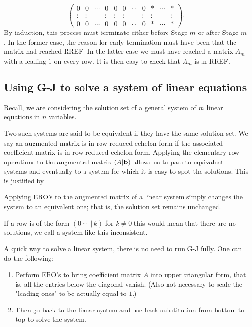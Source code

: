 \documentclass[10pt, a4paper]{article}
\begin{document}
\begin{enumerate}[label = (\roman*).]
\[\begin{pmatrix}
        0 & 0 & \dotsi & 0 & 0 & 0 & \dotsi & 0 & * & \dotsi & * \\
        \vdots & \vdots & \phantom{} & \vdots & \vdots & \vdots & \phantom{} & \vdots & \vdots & \phantom{} & \vdots \\
        0 & 0 & \dotsi & 0 & 0 & 0 & \dotsi & 0 & * & \dotsi & *
    \end{pmatrix}.
    \]
    By induction, this process must terminate either before Stage $m$ or after Stage $m$.
    In the former case,
    the reason for early termination must have been that the matrix had reached RREF.
    In the latter case we must have reached a matrix $A_m$ with a leading $1$ on every row.
    It is then easy to check that $A_m$ is in RREF.
\end{enumerate}

\subsection{Using G-J to solve a system of linear equations}
Recall, we are considering the solution set of a general system of $m$ linear equations in $n$ variables.

Two such systems are said to be equivalent if they have the same solution set.
We say an augmented matrix is in row reduced echelon form if the associated coefficient matrix is in row reduced echelon form.
Applying the elementary row operations to the augmented matrix $(A | \mathbf{b})$ allows us to pass to equivalent systems and eventually to a system for which it is easy to spot the solutions.
This is justified by
\begin{theorem}\label{pre:linalg:thm:lintoech}
    Applying ERO's to the augmented matrix of a linear system simply changes the system to an equivalent one; that is, the solution set remains unchanged.
\end{theorem}

If a row is of the form $(0\ \dotsi\ \,|\, k)$ for $k \neq 0$ this would mean that there are no solutions,
we call a system like this inconsistent.

A quick way to solve a linear system,
there is no need to run G-J fully.
One can do the following:
\begin{enumerate}[label = \arabic*) :]
    \item Perform ERO's to bring coefficient matrix $A$ into upper triangular form,
    that is, all the entries below the diagonal vanish.
    (Also not necessary to scale the "leading ones" to be actually equal to $1$.)
    \item Then go back to the linear system and use back substitution from bottom to top to solve the system.
\end{enumerate}
\end{document}
